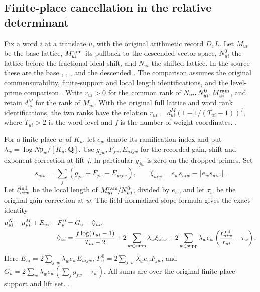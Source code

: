 \subsection{Finite-place cancellation in the relative determinant}
\label{geom:relative-finite-index}

Fix a word \(i\) at a translate \(u\), with the original arithmetic
record \(D,L\). Let \(M_{ui}\) be the base lattice, \(M^{\rm ram}_{ui}\)
its pullback to the descended vector space, \(N^0_{ui}\) the lattice
before the fractional-ideal shift, and \(N_{ui}\) the shifted lattice.
In the source these are the base , ,
, and the descended . The comparison
assumes the original commensurability, finite-support and local
length identifications, and the level-prime comparison
. Write \(r_{ui}>0\) for the common rank of
\(N_{ui},N^0_{ui},M^{\rm ram}_{ui}\), and retain \(d^M_{ui}\) for the
rank of \(M_{ui}\). With the original full lattice and word rank
identifications, the two ranks have the relation
\(r_{ui}=d^M_{ui}(1-1/(T_{ui}-1))^f\), where \(T_{ui}>2\) is the
word level and \(f\) is the number of weight coordinates.
.

For a finite place \(w\) of \(K_u\), let \(e_w\) denote its ramification
index and put \(\lambda_w=\log N\mathfrak p_w/[K_u:\mathbf Q]\).
Use \(g_{jw},F_{jw},E_{uijw}\) for the recorded gain, shift and
exponent correction at lift \(j\). In particular \(g_{jw}\) is zero
on the dropped primes. Set
\[
 s_{uiw}=\sum_j(g_{jw}+F_{jw}-E_{uijw}),\qquad
 \xi_{uiw}=e_ws_{uiw}-\lfloor e_ws_{uiw}\rfloor.
\]
Let \(\ell^{\rm ind}_{uiw}\) be the local length of
\(M^{\rm ram}_{ui}/N^0_{ui}\), divided by \(e_w\), and let
\(\tau_w\) be the original gain correction at \(w\).
The field-normalized slope formula gives the exact identity
\begin{align}
 \mu^N_{ui}-\mu^M_{ui}+E_{ui}-F_u^{\,0}
    &=G_u-\Diamond_{ui},\label{geom:finite-cancel}\\
 \Diamond_{ui}
   &=
   \frac{f\log(T_{ui}-1)}{T_{ui}-2}
     +2\sum_{w\in\mathrm{supp}}\lambda_w\xi_{uiw}
     +2\sum_{w\in\mathrm{supp}}\lambda_we_w
          \left(\frac{\ell^{\rm ind}_{uiw}}{r_{ui}}-\tau_w\right).
   \label{geom:finite-diamond}
\end{align}
Here \(E_{ui}=2\sum_{j,w}\lambda_we_w E_{uijw}\),
\(F_u^{\,0}=2\sum_{j,w}\lambda_we_w F_{jw}\), and
\(G_u=2\sum_w\lambda_we_w(\sum_jg_{jw}-\tau_w)\). All sums are over
the original finite place support and lift set.
.

